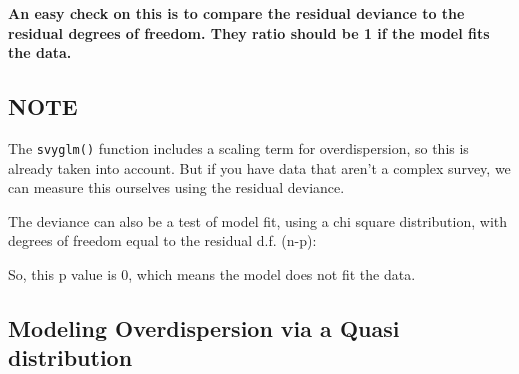 \documentclass[
]{article}
\newenvironment{Shaded}{\begin{snugshade}}{\end{snugshade}}
\newcommand{\AttributeTok}[1]{\textcolor[rgb]{0.77,0.63,0.00}{#1}}
\newcommand{\DecValTok}[1]{\textcolor[rgb]{0.00,0.00,0.81}{#1}}
\newcommand{\FunctionTok}[1]{\textcolor[rgb]{0.00,0.00,0.00}{#1}}
\newcommand{\NormalTok}[1]{#1}
\newcommand{\OtherTok}[1]{\textcolor[rgb]{0.56,0.35,0.01}{#1}}
\newcommand{\SpecialCharTok}[1]{\textcolor[rgb]{0.00,0.00,0.00}{#1}}
\begin{document}
\textbf{An easy check on this is to compare the residual deviance to the residual degrees of freedom. They ratio should be 1 if the model fits the data.}

\hypertarget{note}{%
\subsection{NOTE}\label{note}}

The \texttt{svyglm()} function includes a scaling term for overdispersion, so this is already taken into account. But if you have data that aren't a complex survey, we can measure this ourselves using the residual deviance.

\begin{Shaded}
\end{Shaded}

The deviance can also be a test of model fit, using a chi square distribution, with degrees of freedom equal to the residual d.f. (n-p):

\begin{Shaded}
\end{Shaded}

So, this p value is 0, which means the model does not fit the data.

\hypertarget{modeling-overdispersion-via-a-quasi-distribution}{%
\subsection{Modeling Overdispersion via a Quasi distribution}\label{modeling-overdispersion-via-a-quasi-distribution}}
\end{document}
